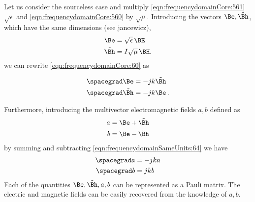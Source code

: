 
Let us consider the sourceless case
and multiply
\cref{eqn:frequencydomainCore:561}
$\sqrt{\epsilon}$ and 
\cref{eqn:frequencydomainCore:560}
by  $\sqrt{\mu}$. Introducing the vectors
$\Be, \tilde{\Bh}$,
which have the same dimensions (see jancewicz),
%
\begin{dmath}\label{eqn:frequencydomainSameUnits:62}
\begin{aligned}
 \Be     &=  \sqrt{\epsilon} \, \BE\\
\tilde{\Bh} &= I \sqrt{\mu}\,  \BH.
\end{aligned}
\end{dmath}
%
we can rewrite \cref{eqn:frequencydomainCore:60} as

\begin{dmath}\label{eqn:frequencydomainSameUnits:64}
\begin{aligned}
\spacegrad \Be     &= -j k \tilde{\Bh} \\
\spacegrad \tilde{\Bh} &=  - j k \Be \, .
\end{aligned}
\end{dmath}

Furthermore, introducing the multivector electromagnetic fields $a, b$ defined as
%
\begin{dmath}\label{eqn:frequencydomainSameUnits:66}
\begin{aligned}
a &= \Be + \tilde{\Bh} \\
b &= \Be - \tilde{\Bh}
\end{aligned}
\end{dmath}
%
by summing and subtracting \cref{eqn:frequencydomainSameUnits:64} we have
%
\begin{dmath}\label{eqn:frequencydomainSameUnits:68}
\begin{aligned}
\spacegrad a &= - j k a \\
\spacegrad b &=  j k b
\end{aligned}
\end{dmath}
%
Each of the quantities $\Be, \tilde{\Bh}, a, b$ can be represented as a Pauli matrix. The electric and magnetic fields can be easily recovered from the knowledge of $a, b$.

